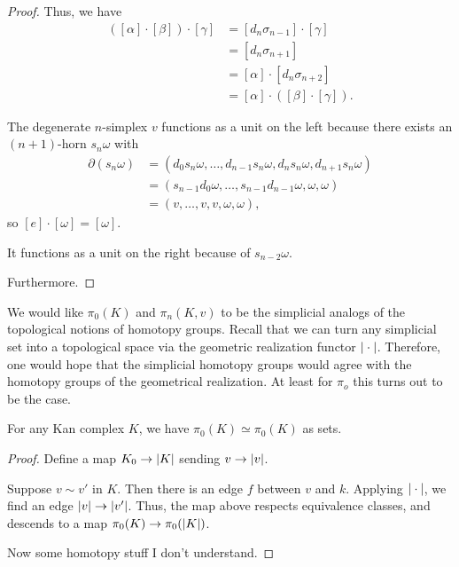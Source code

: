 \documentclass[main.tex]{subfiles}
\begin{document}
\begin{proof}
  Thus, we have
  \begin{align*}
    ([\alpha]\cdot[\beta])\cdot[\gamma] &= [d_{n}\sigma_{n-1}]\cdot[\gamma] \\
    &= [d_{n} \sigma_{n+1}] \\
    &= [\alpha] \cdot [d_{n}\sigma_{n+2}] \\
    &= [\alpha] \cdot ([\beta]\cdot[\gamma]).
  \end{align*}

  The degenerate $n$-simplex $v$ functions as a unit on the left because there exists an $(n+1)$-horn $s_{n}\omega$ with
  \begin{align*}
    \partial(s_{n}\omega) &= (d_{0}s_{n}\omega, \ldots, d_{n-1}s_{n}\omega, d_{n}s_{n}\omega, d_{n+1}s_{n}\omega) \\
    &=(s_{n-1}d_{0}\omega, \ldots, s_{n-1}d_{n-1}\omega, \omega, \omega) \\
    &= (v, \ldots, v, v, \omega, \omega),
  \end{align*}
  so $[e]\cdot[\omega] = [\omega]$. 

  It functions as a unit on the right because of $s_{n-2}\omega$.

  Furthermore.
\end{proof}

We would like $\pi_{0}(K)$ and $\pi_{n}(K, v)$ to be the simplicial analogs of the topological notions of homotopy groups. Recall that we can turn any simplicial set into a topological space via the geometric realization functor ${| \cdot |}$. Therefore, one would hope that the simplicial homotopy groups would agree with the homotopy groups of the geometrical realization. At least for $\pi_{o}$ this turns out to be the case.

\begin{theorem}
  For any Kan complex $K$, we have $\pi_{0}(K) \simeq \pi_{0}(K)$ as sets.
\end{theorem}
\begin{proof}
  Define a map $K_{0} \to {| K |}$ sending $v \to {| v |}$.

  Suppose $v \sim v'$ in $K$. Then there is an edge $f$ between $v$ and $k$. Applying ${| \cdot |}$, we find an edge ${| v |} \to {| v' |}$. Thus, the map above respects equivalence classes, and descends to a map $\pi_{0}(K) \to \pi_{0}({| K |})$.

  Now some homotopy stuff I don't understand.
\end{proof}
\end{document}
